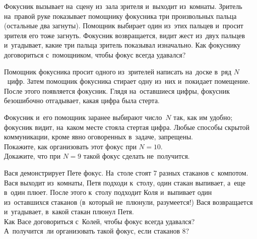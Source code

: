 



\begin{problems}

\item
Фокусник вызывает на~сцену из~зала зрителя и~выходит из~комнаты.
Зритель на~правой руке показывает помощнику фокусника три произвольных пальца
(остальные два загнуты).
Помощник выбирает один из~этих пальцев и~просит зрителя его тоже загнуть.
Фокусник возвращается, видит жест из~двух пальцев и~угадывает, какие три пальца
зритель показывал изначально.
Как фокуснику договориться с~помощником, чтобы фокус всегда удавался?

\item
Помощник фокусника просит одного из~зрителей написать на~доске в~ряд $N$~цифр.
Затем помощник фокусника стирает одну из~них и~покидает помещение.
После этого появляется фокусник.
Глядя на~оставшиеся цифры, фокусник безошибочно отгадывает, какая цифра была
стерта.
\par
Фокусник и~его помощник заранее выбирают число~$N$ так, как им удобно;
фокусник видит, на~каком месте стояла стертая цифра.
Любые способы скрытой коммуникации, кроме явно оговоренных в~задаче, запрещены.
\\
\subproblem Покажите, как организовать этот фокус при $N = 10$.
\\
\subproblem Докажите, что при $N = 9$ такой фокус сделать не~получится.

\item
Вася демонстрирует Пете фокус.
На~столе стоят 7 разных стаканов с~компотом.
Вася выходит из~комнаты, Петя подходи к~столу, один стакан выпивает, а~еще
в~один плюет.
После этого к~столу подходит Коля и~выпивает один из~оставшихся стаканов
(в~который не~плюнули, разумеется!)
Вася возвращается и~угадывает, в~какой стакан плюнул Петя.
\\
\subproblem Как Васе договориться с~Колей, чтобы фокус всегда удавался?
\\
\subproblem А~получится~ли организовать такой фокус, если стаканов 8?


\end{problems}
